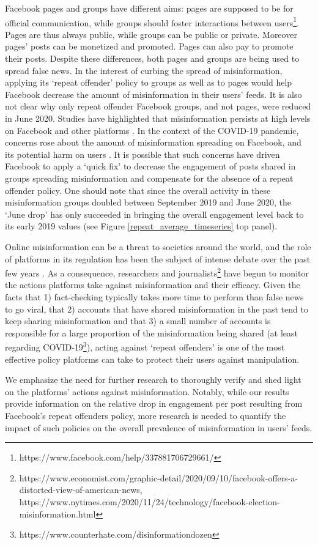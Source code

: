 \documentclass[11pt,a4paper]{article}
\begin{document}
Facebook pages and groups have different aims: pages are supposed to be for official communication, while groups should foster interactions between users\footnote{https://www.facebook.com/help/337881706729661/}. 
Pages are thus always public, while groups can be public or private.
Moreover pages' posts can be monetized and promoted.
Pages can also pay to promote their posts.
Despite these differences, both pages and groups are being used to spread false news. 
In the interest of curbing the spread of misinformation, applying its `repeat offender' policy to groups as well as to pages would help Facebook decrease the amount of misinformation in their users’ feeds. 
It is also not clear why only repeat offender Facebook groups, and not pages, were reduced in June 2020.
Studies have highlighted that misinformation persists at high levels on Facebook and other platforms \citep{kornbluh2020new, resnick2018iffy}.
In the context of the COVID-19 pandemic, concerns rose about the amount of misinformation spreading on Facebook, and its potential harm on users \citep{johnson2020online}.
It is possible that such concerns have driven Facebook to apply a `quick fix' to decrease the engagement of posts shared in groups spreading misinformation and compensate for the absence of a repeat offender policy.
One should note that since the overall activity in these misinformation groups doubled between September 2019 and June 2020, the `June drop' has only succeeded in bringing the overall engagement level back to its early 2019 values (see Figure \ref{repeat_average_timeseries} top panel).

Online misinformation can be a threat to societies around the world, and the role of platforms in its regulation has been the subject of intense debate over the past few years \citep{rogers2020deplatforming, de2020internet}. 
As a consequence, researchers \citep{mena2020cleaning, yaqub2020effects} and journalists\footnote{https://www.economist.com/graphic-detail/2020/09/10/facebook-offers-a-distorted-view-of-american-news, https://www.nytimes.com/2020/11/24/technology/facebook-election-misinformation.html} have begun to monitor the actions platforms take against misinformation and their efficacy. 
Given the facts that 1) fact-checking typically takes more time to perform than false news to go viral, that 2) accounts that have shared misinformation in the past tend to keep sharing misinformation and that 3) a small number of accounts is responsible for a large proportion of the misinformation being shared (at least regarding COVID-19\footnote{https://www.counterhate.com/disinformationdozen}), acting against `repeat offenders' is one of the most effective policy platforms can take to protect their users against manipulation.
 

We emphasize the need for further research to thoroughly verify and shed light on the platforms' actions against misinformation. 
Notably, while our results provide information on the relative drop in engagement per post resulting from Facebook’s repeat offenders policy, more research is needed to quantify the impact of such policies on the overall prevalence of misinformation in users’ feeds.
 


\end{document}
